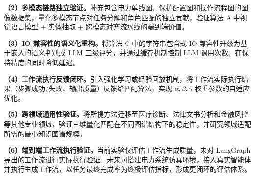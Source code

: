 \textbf{（2）多模态链路独立验证。}补充包含电力单线图、保护配置图和操作流程图的图像数据集，量化多模态节点对任务分解和角色匹配的独立贡献，验证算法 A 中视觉语言模型 + 实体抽取 + 跨模态对齐流水线的端到端价值。

\textbf{（3）IO 兼容性的语义化重构。}将算法 C 中的字符串包含式 IO 兼容性升级为基于嵌入的语义判别或 LLM 三级评分，并通过缓存机制控制 LLM 调用次数，在保持精度的同时降低延迟。

\textbf{（4）工作流执行反馈闭环。}引入强化学习或经验回放机制，将工作流实际执行结果（步骤成功/失败、输出质量）反馈给匹配算法，实现 $\alpha,\beta,\gamma$ 权重参数的自适应优化。

\textbf{（5）跨领域通用性验证。}将所提方法迁移至医疗诊断、法律文书分析和金融风控等其他专业领域，验证三维量化匹配在不同图谱结构下的稳定性，并研究领域适配所需的最小知识图谱规模。

\textbf{（6）端到端工作流执行验证。}当前实验仅评估工作流生成质量，未对 LangGraph 导出的工作流进行实际执行验证。未来可搭建电力系统仿真环境，接入真实智能体并执行生成工作流，以任务最终完成率为终极评估指标，形成更闭环的评估体系。
